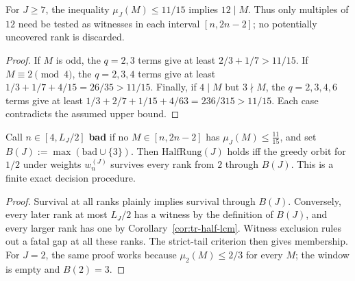 \begin{lem}
\label{lem:tr-mod12}
For $J\ge7$, the inequality $\mu_J(M)\le11/15$ implies $12\mid M$.
Thus only multiples of $12$ need be tested as witnesses in each interval
$[n,2n-2]$; no potentially uncovered rank is discarded.
\end{lem}
\begin{proof}
If $M$ is odd, the $q=2,3$ terms give at least $2/3+1/7>11/15$.
If $M\equiv2\pmod4$, the $q=2,3,4$ terms give at least
$1/3+1/7+4/15=26/35>11/15$.  Finally, if $4\mid M$ but $3\nmid M$,
the $q=2,3,4,6$ terms give at least
$1/3+2/7+1/15+4/63=236/315>11/15$.
Each case contradicts the assumed upper bound.
\end{proof}

\begin{thm}
\label{thm:tr-finite-decision}
Call $n\in[4,L_J/2]$ \textbf{bad} if no $M\in[n,2n-2]$ has $\mu_J(M)\le\tfrac{11}{15}$, and set
$B(J):=\max(\mathrm{bad}\cup\{3\})$. Then $\mathrm{HalfRung}(J)$ holds iff the greedy orbit for
$1/2$ under weights $w_n^{(J)}$ survives every rank from $2$ through
$B(J)$.  This is a finite exact decision procedure.
\end{thm}
\begin{proof}
Survival at all ranks plainly implies survival through $B(J)$.
Conversely, every later rank at most $L_J/2$ has a witness by the
definition of $B(J)$, and every larger rank has one by
Corollary~\ref{cor:tr-half-lcm}.  Witness exclusion rules out a fatal gap
at all these ranks.  The strict-tail criterion then gives membership.
For $J=2$, the same proof works because $\mu_2(M)\le2/3$ for every $M$;
the window is empty and $B(2)=3$.
\end{proof}

